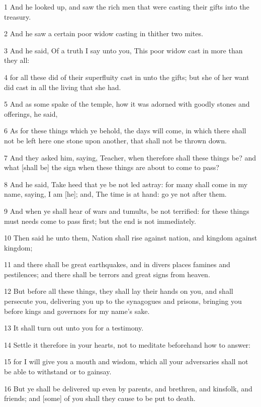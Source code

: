 \par 1 And he looked up, and saw the rich men that were casting their gifts into the treasury.
\par 2 And he saw a certain poor widow casting in thither two mites.
\par 3 And he said, Of a truth I say unto you, This poor widow cast in more than they all:
\par 4 for all these did of their superfluity cast in unto the gifts; but she of her want did cast in all the living that she had.
\par 5 And as some spake of the temple, how it was adorned with goodly stones and offerings, he said,
\par 6 As for these things which ye behold, the days will come, in which there shall not be left here one stone upon another, that shall not be thrown down.
\par 7 And they asked him, saying, Teacher, when therefore shall these things be? and what [shall be] the sign when these things are about to come to pass?
\par 8 And he said, Take heed that ye be not led astray: for many shall come in my name, saying, I am [he]; and, The time is at hand: go ye not after them.
\par 9 And when ye shall hear of wars and tumults, be not terrified: for these things must needs come to pass first; but the end is not immediately.
\par 10 Then said he unto them, Nation shall rise against nation, and kingdom against kingdom;
\par 11 and there shall be great earthquakes, and in divers places famines and pestilences; and there shall be terrors and great signs from heaven.
\par 12 But before all these things, they shall lay their hands on you, and shall persecute you, delivering you up to the synagogues and prisons, bringing you before kings and governors for my name's sake.
\par 13 It shall turn out unto you for a testimony.
\par 14 Settle it therefore in your hearts, not to meditate beforehand how to answer:
\par 15 for I will give you a mouth and wisdom, which all your adversaries shall not be able to withstand or to gainsay.
\par 16 But ye shall be delivered up even by parents, and brethren, and kinsfolk, and friends; and [some] of you shall they cause to be put to death.
